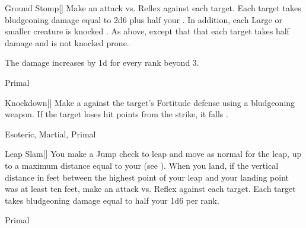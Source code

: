 \lowercase{\hypertarget{maneuver:Ground Stomp}{}}\label{maneuver:Ground Stomp}
\hypertarget{maneuver:Ground Stomp}{}
\begin{freeability}[Rank 3]{Ground Stomp}[]
Make an attack vs. Reflex against each target.
\hit Each target takes bludgeoning damage equal to 2d6 plus half your .
In addition, each Large or smaller creature is knocked .
\glance As above, except that that each target takes half damage and is not knocked prone.

\rankline
The damage increases by \plus1d for every rank beyond 3.


 Primal
\end{freeability}
\vspace{0.25em}



\lowercase{\hypertarget{maneuver:Knockdown}{}}\label{maneuver:Knockdown}
\hypertarget{maneuver:Knockdown}{}
\begin{freeability}[Rank 3]{Knockdown}[]
Make a  against the target's Fortitude defense using a bludgeoning weapon.
If the target loses hit points from the strike, it falls .


 Esoteric, Martial, Primal
\end{freeability}
\vspace{0.25em}



\lowercase{\hypertarget{maneuver:Leap Slam}{}}\label{maneuver:Leap Slam}
\hypertarget{maneuver:Leap Slam}{}
\begin{freeability}[Rank 3]{Leap Slam}[]
You make a Jump check to leap and move as normal for the leap, up to a maximum distance equal to your  (see ).
When you land, if the vertical distance in feet between the highest point of your leap and your landing point was at least ten feet, make an attack vs. Reflex against each target.
\hit Each target takes bludgeoning damage equal to half your  \add 1d6 per rank.


 Primal
\end{freeability}
\vspace{0.25em}



